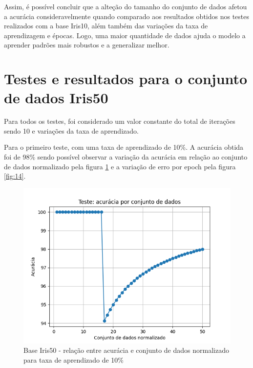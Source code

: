 \documentclass[12pt, %
openright, 
oneside, %
a4paper,    %
brazil]{facom-ufu-abntex2}
\begin{document}
Assim, é possível concluir que a alteção do tamanho do conjunto de dados afetou a acurácia consideravelmente quando comparado aos resultados obtidos nos testes realizados com a base Iris10, além também das variações da taxa de aprendizagem e épocas. Logo, uma maior quantidade de dados ajuda o modelo a aprender padrões mais robustos e a generalizar melhor. 

\section{Testes e resultados para o conjunto de dados Iris50}
Para todos os testes, foi considerado um valor constante do total de iterações sendo 10 e variações da taxa de aprendizado.

Para o primeiro teste, com uma taxa de aprendizado de 10\%. A acurácia obtida foi de 98\% sendo possível observar a variação da acurácia em relação ao conjunto de dados normalizado pela figura \ref{fig:13} e a variação de erro por epoch pela figura \ref{fig:14}.

\begin{figure}[H]
\centering
\includegraphics[scale=0.9]{figuras/acuracia_7.png}
\caption{Base Iris50 - relação entre acurácia e conjunto de dados normalizado para taxa de aprendizado de 10\%}
\label{fig:13}
\end{figure}
\end{document}
